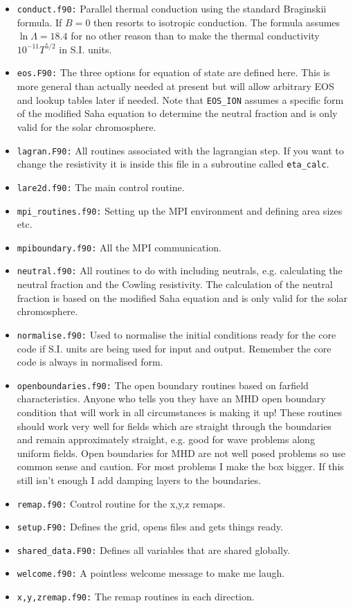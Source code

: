 \documentclass[11pt]{article}
\begin{document}
\begin{itemize}  
  \item{\texttt{conduct.f90:}} Parallel thermal conduction using the standard Braginskii formula. If $B=0$ then resorts to isotropic conduction. The formula assumes $\ln\Lambda=18.4$ for no other reason than to make the thermal conductivity $10^{-11}T^{5/2}$ in S.I. units.
  \item{\texttt{eos.F90:}} The three options for equation of state are defined here. This is more general than actually needed at present but will allow arbitrary EOS and lookup tables later if needed. Note that \texttt{EOS\_ION} assumes a specific form of the modified Saha equation to determine the neutral fraction and is only valid for the solar chromosphere.
  \item{\texttt{lagran.F90:}} All routines associated with the lagrangian step. If you want to change the resistivity it is inside this file in a subroutine called \texttt{eta\_calc}. 
  \item{\texttt{lare2d.f90:}} The main control routine.
  \item{\texttt{mpi\_routines.f90:}} Setting up the MPI environment and defining area sizes etc.
  \item{\texttt{mpiboundary.f90:}} All the MPI communication.
  \item{\texttt{neutral.f90:}} All routines to do with including neutrals, e.g. calculating the neutral fraction and the Cowling resistivity. The calculation of the neutral fraction is based on the modified Saha equation and is only valid for the solar chromosphere.
  \item{\texttt{normalise.f90:}} Used to normalise the initial conditions ready for the core code if S.I. units are being used for input and output. Remember the core code is always in normalised form.
  \item{\texttt{openboundaries.f90:}} The open boundary routines based on farfield characteristics. Anyone who tells you they have an MHD open boundary condition that will work in all circumstances is making it up! These routines should work very well for fields which are straight through the boundaries and remain approximately straight, e.g. good for wave problems along uniform fields. Open boundaries for MHD are not well posed problems so use common sense and caution. For most problems I make the box bigger. If this still isn't enough I add damping layers to the boundaries. 
  \item{\texttt{remap.f90:}} Control routine for the x,y,z remaps.
  \item{\texttt{setup.F90:}} Defines the grid, opens files and gets things ready.
  \item{\texttt{shared\_data.F90:}} Defines all variables that are shared globally. 
  \item{\texttt{welcome.f90:}} A pointless welcome message to make me laugh.
  \item{\texttt{x,y,zremap.f90:}} The remap routines in each direction.
\end{itemize} 
\end{document}
